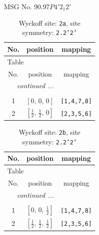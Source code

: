 \documentclass[fleqn,8pt]{jsarticle}
\begin{document}
\setcounter{MaxMatrixCols}{32}

\renewcommand{\tablename}{Table~}
\renewcommand{\figurename}{Figure~}
\begin{center}
\LARGE
MSG No. 90.97\quad$P4'2_{1}2'$
\end{center}
\renewcommand{\arraystretch}{1.2}
\begin{longtable}{ccc}
\caption{Wyckoff site: {\tt 2a}, site symmetry: {\tt 2.2'2'}}
 \\
 \hline \hline
No. & position & mapping \\ \hline \endfirsthead

\multicolumn{2}{l}{\tablename\ \thetable{}} \\
 \hline \hline
No. & position & mapping \\ \hline \endhead

 \hline \hline
\multicolumn{2}{r}{\footnotesize\it continued ...} \\ \endfoot

 \hline \hline
\multicolumn{2}{r}{} \\ \endlastfoot

1 & $\left[ 0,\, 0,\, 0 \right]$ & {\tt [1,4,7,8]} \\ \hline
2 & $\left[ \frac{1}{2},\, \frac{1}{2},\, 0 \right]$ & {\tt [2,3,5,6]} \\
\end{longtable}
\renewcommand{\arraystretch}{1.2}
\begin{longtable}{ccc}
\caption{Wyckoff site: {\tt 2b}, site symmetry: {\tt 2.2'2'}}
 \\
 \hline \hline
No. & position & mapping \\ \hline \endfirsthead

\multicolumn{2}{l}{\tablename\ \thetable{}} \\
 \hline \hline
No. & position & mapping \\ \hline \endhead

 \hline \hline
\multicolumn{2}{r}{\footnotesize\it continued ...} \\ \endfoot

 \hline \hline
\multicolumn{2}{r}{} \\ \endlastfoot

1 & $\left[ 0,\, 0,\, \frac{1}{2} \right]$ & {\tt [1,4,7,8]} \\ \hline
2 & $\left[ \frac{1}{2},\, \frac{1}{2},\, \frac{1}{2} \right]$ & {\tt [2,3,5,6]} \\
\end{longtable}
\end{document}
